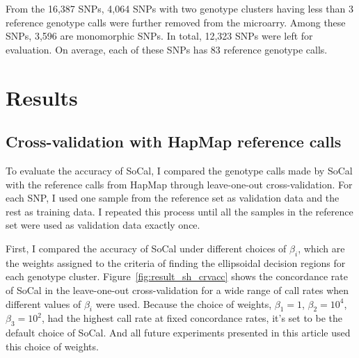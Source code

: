 \documentclass{scrartcl}
\begin{document}
\par
From the 16,387 SNPs, 4,064 SNPs with two genotype clusters having less than
3 reference genotype calls were further removed from the microarry.
Among these SNPs, 3,596 are monomorphic SNPs.
In total, 12,323 SNPs were left for evaluation.
On average, each of these SNPs has 83 reference genotype calls.





\section{Results}

\subsection{Cross-validation with HapMap reference calls}

\par
To evaluate the accuracy of SoCal, I compared the genotype calls made by SoCal
with the reference calls from HapMap through leave-one-out
cross-validation.
For each SNP, I used one sample from the reference set as validation data and
the rest as training data.
I repeated this process until all the samples in the reference set were used
as validation data exactly once.

\par
First, I compared the accuracy of SoCal under different choices of $\beta_i$,
which are the weights assigned to the criteria of finding the ellipsoidal
decision regions for each genotype cluster.
Figure~\ref{fig:result_sh_crvacc} shows the concordance rate of SoCal in the
leave-one-out cross-validation for a wide range of call rates when different
values of $\beta_i$ were used.
Because the choice of weights, $\beta_1=1$, $\beta_2=10^4$, $\beta_3=10^2$,
had the highest call rate at fixed concordance rates, it's set to be the
default choice of SoCal.
And all future experiments presented in this article used this choice
of weights.
\end{document}
